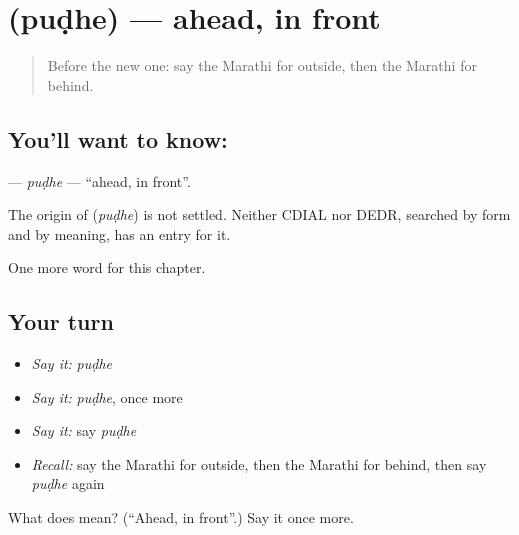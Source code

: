 \section[\texorpdfstring{\mr{पुढे} (puḍhe)}{पुढे (puḍhe)}]{ (puḍhe) — ahead, in front}

\label{lesson:MR-C112-pudhe}



\begin{quote}
Before the new one: say the Marathi for outside, then the Marathi for behind.
\end{quote}

\subsection*{You'll want to know: }
\textbf{} — \emph{puḍhe} — \textquotedblleft{}ahead, in front\textquotedblright{}.

\begin{cousinweb}
The origin of \textbf{} (\emph{puḍhe}) is not settled. Neither CDIAL nor DEDR, searched by form and by meaning, has an entry for it.
\end{cousinweb}

\begin{grammarlens}[title={What you've built}]
One more word for this chapter.
\end{grammarlens}

\subsection*{Your turn}
\begin{itemize}
\raggedright
  \item \emph{Say it:} \emph{puḍhe}
  \item \emph{Say it:} \emph{puḍhe}, once more
  \item \emph{Say it:} say \emph{puḍhe}
  \item \emph{Recall:} say the Marathi for outside, then the Marathi for behind, then say \emph{puḍhe} again
\end{itemize}

\begin{tcolorbox}[breakable,colback=teal!4,colframe=teal!35!black,title={Before you move on}]
What does  mean? (\textquotedblleft{}Ahead, in front\textquotedblright{}.) Say it once more.
\end{tcolorbox}
